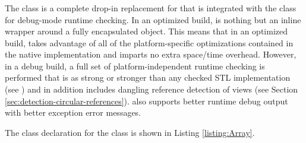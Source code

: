 \documentclass[pdf,ps2pdf,11pt]{SANDreport}
\begin{document}
%
{}\subsubsection{}
\label{sec:Array}
%

The class {} is a complete drop-in replacement for
{} that is integrated with the
{} class for debug-mode runtime checking.  In an
optimized build, {} is nothing but an inline wrapper
around a fully encapsulated {} object.  This means
that in an optimized build, {} takes advantage of all of
the platform-specific optimizations contained in the native
{} implementation and imparts no extra space/time
overhead.  However, in a debug build, a full set of
platform-independent runtime checking is performed that is as strong
or stronger than any checked STL implementation (see {}\cite[Item
{}\#83]{C++CodingStandards05}) and in addition includes dangling
reference detection of {} views (see Section
{}\ref{sec:detection-circular-references}).  {} also
supports better runtime debug output with better exception error
messages.

The class declaration for the {} class is shown in
Listing {}\ref{listing:Array}.
\end{document}
